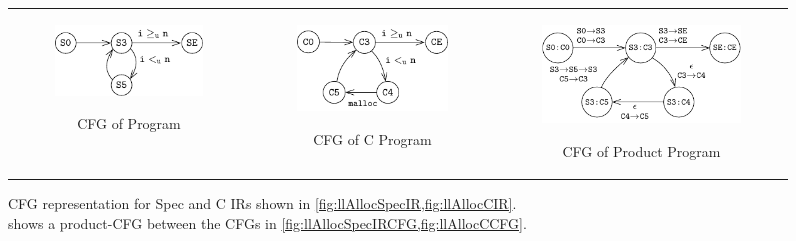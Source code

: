 \begin{figure}[]
\begin{tabular}{ccc}
\begin{subfigure}[b]{0.27\textwidth}
\begin{center}
{\includegraphics[scale=1]{chapters/figures/figMallocSpecCfg.pdf}}
\vspace{2pt}
\end{center}
\caption{\label{fig:llAllocSpecIRCFG}CFG of \SpecL{} Program}
\end{subfigure}%
&
\begin{subfigure}[b]{0.27\textwidth}
\begin{center}
{\includegraphics[scale=0.95]{chapters/figures/figMallocCCfg.pdf}}
\vspace{7pt}
\end{center}
\caption{\label{fig:llAllocCCFG}CFG of C Program}
\end{subfigure}%
&
\begin{subfigure}[b]{0.36\textwidth}
\begin{center}
{\includegraphics[scale=1]{chapters/figures/figMallocProductCfg.pdf}}
\end{center}
\caption{\label{fig:llAllocProductCFG}CFG of Product Program}
\end{subfigure}%
\\
\end{tabular}
\caption{\label{fig:mallocSpecCFGAndCCFGAndProductCFG}CFG representation for Spec and C IRs shown in \cref{fig:llAllocSpecIR,fig:llAllocCIR}.\\  shows a product-CFG between the CFGs in \cref{fig:llAllocSpecIRCFG,fig:llAllocCCFG}.}
\end{figure}
